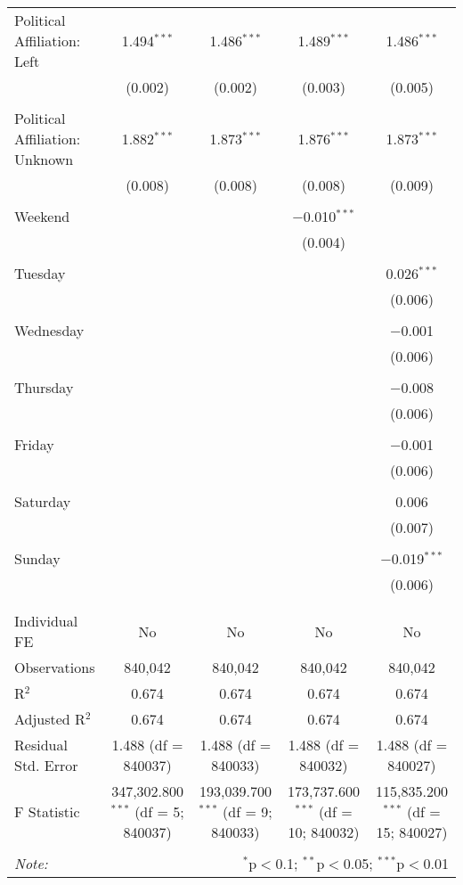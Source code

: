 \documentclass[
]{article}
\begin{document}
\begin{table}[!htbp]
{\begin{tabular}{@{\extracolsep{5pt}}lcccc}
 Political Affiliation: Left & 1.494$^{***}$ & 1.486$^{***}$ & 1.489$^{***}$ & 1.486$^{***}$ \\ 
  & (0.002) & (0.002) & (0.003) & (0.005) \\ 
  & & & & \\ 
 Political Affiliation: Unknown & 1.882$^{***}$ & 1.873$^{***}$ & 1.876$^{***}$ & 1.873$^{***}$ \\ 
  & (0.008) & (0.008) & (0.008) & (0.009) \\ 
  & & & & \\ 
 Weekend &  &  & $-$0.010$^{***}$ &  \\ 
  &  &  & (0.004) &  \\ 
  & & & & \\ 
 Tuesday &  &  &  & 0.026$^{***}$ \\ 
  &  &  &  & (0.006) \\ 
  & & & & \\ 
 Wednesday &  &  &  & $-$0.001 \\ 
  &  &  &  & (0.006) \\ 
  & & & & \\ 
 Thursday &  &  &  & $-$0.008 \\ 
  &  &  &  & (0.006) \\ 
  & & & & \\ 
 Friday &  &  &  & $-$0.001 \\ 
  &  &  &  & (0.006) \\ 
  & & & & \\ 
 Saturday &  &  &  & 0.006 \\ 
  &  &  &  & (0.007) \\ 
  & & & & \\ 
 Sunday &  &  &  & $-$0.019$^{***}$ \\ 
  &  &  &  & (0.006) \\ 
  & & & & \\ 
\hline \\[-1.8ex] 
Individual FE & No & No & No & No \\ 
Observations & 840,042 & 840,042 & 840,042 & 840,042 \\ 
R$^{2}$ & 0.674 & 0.674 & 0.674 & 0.674 \\ 
Adjusted R$^{2}$ & 0.674 & 0.674 & 0.674 & 0.674 \\ 
Residual Std. Error & 1.488 (df = 840037) & 1.488 (df = 840033) & 1.488 (df = 840032) & 1.488 (df = 840027) \\ 
F Statistic & 347,302.800$^{***}$ (df = 5; 840037) & 193,039.700$^{***}$ (df = 9; 840033) & 173,737.600$^{***}$ (df = 10; 840032) & 115,835.200$^{***}$ (df = 15; 840027) \\ 
\hline 
\hline \\[-1.8ex] 
\textit{Note:}  & \multicolumn{4}{r}{$^{*}$p$<$0.1; $^{**}$p$<$0.05; $^{***}$p$<$0.01} \\ 
\end{tabular}
} 
\end{table} 
\newpage
\end{document}
